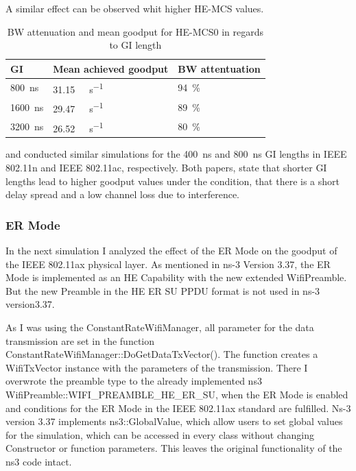 A similar effect can be observed whit higher HE-\ac{MCS} values.
\begin{table}[H]
	\centering
	\begin{tabular}{>{\centering}p{3cm}p{3cm}p{3cm}}
		\toprule
		\ac{GI} & Mean achieved goodput & \ac{BW} attentuation\\
		\midrule
		\SI{800}{\nano\second} & \SI{31.15}{\giga\bit\per\second}&
		\SI{94}{\percent} \\
		\SI{1600}{\nano\second} &
		\SI{29.47}{\giga\bit\per\second}&
		\SI{89}{\percent} \\
		\SI{3200}{\nano\second} & \SI{26.52}{\giga\bit\per\second}&
		\SI{80}{\percent} \\
		\bottomrule
	\end{tabular}
	\caption{\acf{BW} attenuation and mean goodput for HE-\ac{MCS}0 in regards to \acf{GI} length}
	\label{tab:GIbandwidthAttenuation}
\end{table}

\textcite{patil_ieee_2020} and \textcite{karmakar_s2-gi_2020} conducted similar simulations
for the \SI{400}{\nano\second} and \SI{800}{\nano\second} \ac{GI} lengths in IEEE 802.11n and IEEE 802.11ac, respectively.
Both papers, state that shorter \ac{GI} lengths lead to higher goodput values under the condition, that there is a short delay spread and a low
channel loss due to interference.

\subsubsection*{\acf{ER} Mode}

In the next simulation I analyzed the effect of the \ac{ER} Mode on the goodput of the IEEE 802.11ax physical layer.
As mentioned in ns-3 Version 3.37, the \ac{ER} Mode is implemented as an \ac{HE} Capability with the new extended WifiPreamble.
But the new Preamble in the \ac{HE} \ac{ER} SU \ac{PPDU} format is not used in ns-3 version3.37.

As I was using the ConstantRateWifiManager, all parameter  for the data transmission are set in the function
ConstantRateWifiManager::DoGetDataTxVector().
The function creates a WifiTxVector instance with the parameters of the
transmission.
There I overwrote the preamble type to the already implemented ns3 WifiPreamble::WIFI\_PREAMBLE\_HE\_ER\_SU, when
the \ac{ER} Mode is enabled and conditions for the \ac{ER} Mode in the IEEE 802.11ax standard \cite{noauthor_ieee_2021} are fulfilled.
Ns-3 version 3.37 implements ns3::GlobalValue, which allow users to set global values for the simulation, which can be accessed
in every class without changing Constructor or function parameters.
This leaves the original functionality of the ns3 code intact.

